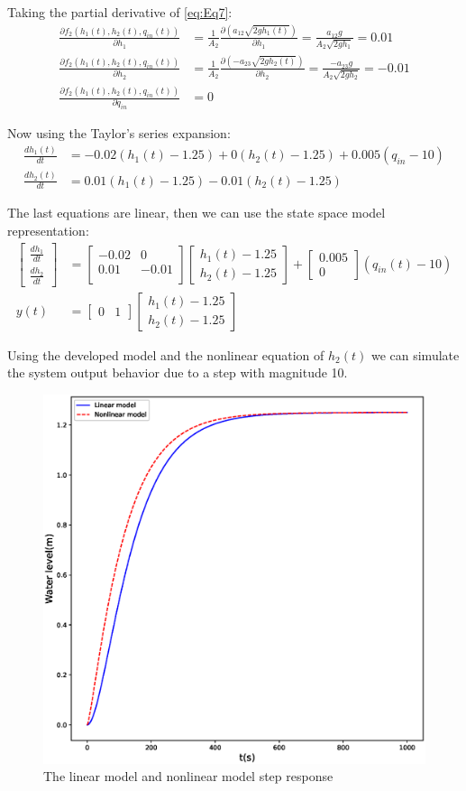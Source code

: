 \documentclass[a4paper,11pt]{article}
\begin{document}
\par Taking the partial derivative of \eqref{eq:Eq7}:
\begin{align*}
\frac{\partial f_2(h_1(t),h_2(t),q_{in}(t))}{\partial h_1}&= \frac{1}{A_2}\frac{\partial(a_{12}\sqrt{2gh_1(t)})}{\partial h_1}=\frac{a_{12}g}{
A_2\sqrt{2gh_1}}=0.01\\
\frac{\partial f_2(h_1(t),h_2(t),q_{in}(t))}{\partial h_2}&= \frac{1}{A_2}\frac{\partial(-a_{23}\sqrt{2gh_2(t)})}{\partial h_2}=\frac{-a_{23}g}{
A_2\sqrt{2gh_2}}=-0.01\\
\frac{\partial f_2(h_1(t),h_2(t),q_{in}(t))}{\partial q_{in}}&=0
\end{align*}
\par Now using the Taylor's series expansion:
\begin{align*}
\frac{dh_1(t)}{dt}&=-0.02(h_1(t)-1.25)+0(h_2(t)-1.25)+0.005(q_{in}-10)\\
\frac{dh_2(t)}{dt}&=0.01(h_1(t)-1.25)-0.01(h_2(t)-1.25)
\end{align*}
\par The last equations are linear, then we can use the state space model representation:
\begin{align}
\label{eq:Eq8}
\begin{bmatrix}
\frac{d h_1}{dt}\\
\frac{d h_2}{dt}
\end{bmatrix}&=\begin{bmatrix}
-0.02 & 0\\
0.01 & -0.01\\
\end{bmatrix}\begin{bmatrix}
h_1(t) - 1.25\\
h_2(t) -1.25
\end{bmatrix}
+\begin{bmatrix}
0.005\\
0
\end{bmatrix}(q_{in}(t)-10)\\
y(t) &= \begin{bmatrix}
0& 1
\end{bmatrix}\begin{bmatrix}
h_1(t)-1.25\\
h_2(t)-1.25
\end{bmatrix}
\end{align}
\par Using the developed model and the nonlinear equation of $h_2(t)$ we can simulate the system output behavior due to a step with magnitude 10.
\begin{figure}[H]
\centering
\includegraphics[width=0.4\columnwidth]{Figures/Question1/Compare.eps}
\caption{The linear model and nonlinear model step response}
\end{figure}
\end{document}
